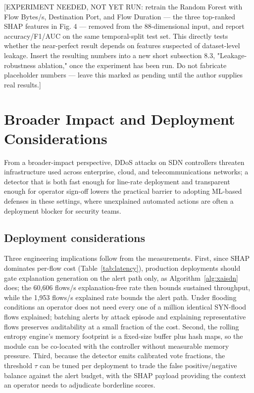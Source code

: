 \documentclass{ieeeaccess}
\begin{document}
[EXPERIMENT NEEDED, NOT YET RUN: retrain the Random Forest with Flow Bytes/s, Destination Port, and Flow Duration — the three top-ranked SHAP features in Fig. 4 — removed from the 88-dimensional input, and report accuracy/F1/AUC on the same temporal-split test set. This directly tests whether the near-perfect result depends on features suspected of dataset-level leakage. Insert the resulting numbers into a new short subsection 8.3, "Leakage-robustness ablation," once the experiment has been run. Do not fabricate placeholder numbers — leave this marked as pending until the author supplies real results.]

\section{Broader Impact and Deployment Considerations}
\label{sec:discussion}

From a broader-impact perspective, DDoS attacks on SDN controllers threaten infrastructure used across enterprise, cloud, and telecommunications networks; a detector that is both fast enough for line-rate deployment and transparent enough for operator sign-off lowers the practical barrier to adopting ML-based defenses in these settings, where unexplained automated actions are often a deployment blocker for security teams.

\subsection{Deployment considerations}
Three engineering implications follow from the measurements. First, since SHAP dominates per-flow cost (Table~\ref{tab:latency}), production deployments should gate explanation generation on the alert path only, as Algorithm~\ref{alg:xaisdn} does; the 60,606 flows/s explanation-free rate then bounds sustained throughput, while the 1,953 flows/s explained rate bounds the alert path. Under flooding conditions an operator does not need every one of a million identical SYN-flood flows explained; batching alerts by attack episode and explaining representative flows preserves auditability at a small fraction of the cost. Second, the rolling entropy engine's memory footprint is a fixed-size buffer plus hash maps, so the module can be co-located with the controller without measurable memory pressure. Third, because the detector emits calibrated vote fractions, the threshold $\tau$ can be tuned per deployment to trade the false positive/negative balance against the alert budget, with the SHAP payload providing the context an operator needs to adjudicate borderline scores.
\end{document}

